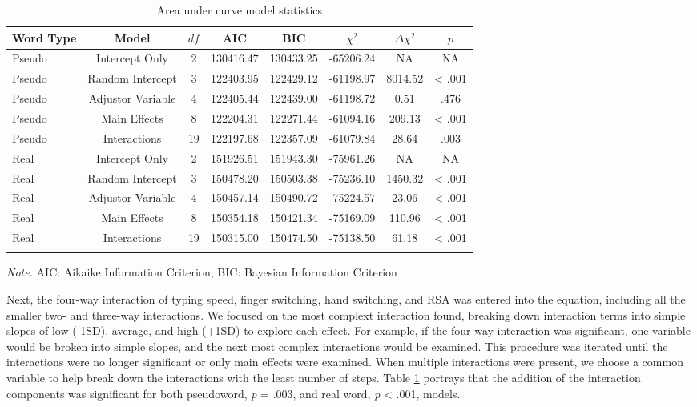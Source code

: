 \documentclass[english,man]{apa6}
\theoremstyle{definition}
\theoremstyle{definition}
\theoremstyle{definition}
\theoremstyle{remark}
\begin{document}
\begin{table}[tbp]
\begin{center}
\begin{threeparttable}
\caption{\label{tab:model-table1}Area under curve model statistics}
\begin{tabular}{lccccccc}
\toprule
Word Type & Model & $df$ & AIC & BIC & $\chi^2$ & $\Delta\chi^2$ & $p$\\
\midrule
Pseudo & Intercept Only & 2 & 130416.47 & 130433.25 & -65206.24 & NA & NA\\
Pseudo & Random Intercept & 3 & 122403.95 & 122429.12 & -61198.97 & 8014.52 & < .001\\
Pseudo & Adjustor Variable & 4 & 122405.44 & 122439.00 & -61198.72 & 0.51 & .476\\
Pseudo & Main Effects & 8 & 122204.31 & 122271.44 & -61094.16 & 209.13 & < .001\\
Pseudo & Interactions & 19 & 122197.68 & 122357.09 & -61079.84 & 28.64 & .003\\
Real & Intercept Only & 2 & 151926.51 & 151943.30 & -75961.26 & NA & NA\\
Real & Random Intercept & 3 & 150478.20 & 150503.38 & -75236.10 & 1450.32 & < .001\\
Real & Adjustor Variable & 4 & 150457.14 & 150490.72 & -75224.57 & 23.06 & < .001\\
Real & Main Effects & 8 & 150354.18 & 150421.34 & -75169.09 & 110.96 & < .001\\
Real & Interactions & 19 & 150315.00 & 150474.50 & -75138.50 & 61.18 & < .001\\
\bottomrule
\addlinespace
\end{tabular}
\begin{tablenotes}[para]
\textit{Note.} AIC: Aikaike Information Criterion, BIC: Bayesian Information Criterion
\end{tablenotes}
\end{threeparttable}
\end{center}
\end{table}

Next, the four-way interaction of typing speed, finger switching, hand
switching, and RSA was entered into the equation, including all the
smaller two- and three-way interactions. We focused on the most complext
interaction found, breaking down interaction terms into simple slopes of
low (-1SD), average, and high (+1SD) to explore each effect. For
example, if the four-way interaction was significant, one variable would
be broken into simple slopes, and the next most complex interactions
would be examined. This procedure was iterated until the interactions
were no longer significant or only main effects were examined. When
multiple interactions were present, we choose a common variable to help
break down the interactions with the least number of steps. Table
\ref{tab:model-table1} portrays that the addition of the interaction
components was significant for both pseudoword, \emph{p} = .003, and
real word, \emph{p} \textless{} .001, models.
\end{document}
